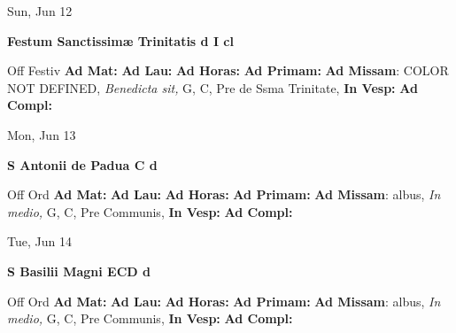 \documentclass[10pt]{book}
\begin{document}
\begin{center}
\begin{minipage}{3.5in}
\vspace{2em}
\begin{center}Sun, Jun 12
\end{center}
\textbf{ \large Festum Sanctissimæ Trinitatis
\textnormal{\normalsize d I cl}}

\begin{justify}Off Festiv
\textbf{Ad Mat: }
\textbf{Ad Lau: }
\textbf{Ad Horas: }
\textbf{Ad Primam: }\textbf{Ad Missam}: COLOR NOT DEFINED, \textit{Benedicta sit,} G, C, Pre de Ssma Trinitate, 
\textbf{In Vesp: }
\textbf{Ad Compl: }
\end{justify}
\end{minipage}
\end{center}

\begin{center}
\begin{minipage}{3.5in}
\vspace{2em}
\begin{center}Mon, Jun 13
\end{center}
\textbf{ \large S Antonii de Padua C
\textnormal{\normalsize d}}

\begin{justify}Off Ord
\textbf{Ad Mat: }
\textbf{Ad Lau: }
\textbf{Ad Horas: }
\textbf{Ad Primam: }\textbf{Ad Missam}: albus, \textit{In medio,} G, C, Pre Communis, 
\textbf{In Vesp: }
\textbf{Ad Compl: }
\end{justify}
\end{minipage}
\end{center}

\begin{center}
\begin{minipage}{3.5in}
\vspace{2em}
\begin{center}Tue, Jun 14
\end{center}
\textbf{ \large S Basilii Magni ECD
\textnormal{\normalsize d}}

\begin{justify}Off Ord
\textbf{Ad Mat: }
\textbf{Ad Lau: }
\textbf{Ad Horas: }
\textbf{Ad Primam: }\textbf{Ad Missam}: albus, \textit{In medio,} G, C, Pre Communis, 
\textbf{In Vesp: }
\textbf{Ad Compl: }
\end{justify}
\end{minipage}
\end{center}
\end{document}
